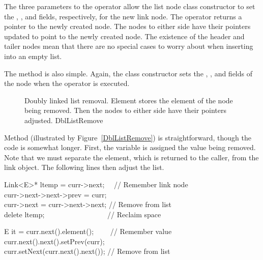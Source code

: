The three parameters to the 
operator allow the list node
class constructor to set the , , and
 fields, respectively, for the new link node.
The  operator returns a pointer to the newly created node.
The nodes to either side have their pointers updated to point to the
newly created node.
The existence of the header and tailer nodes mean that there are no
special cases to worry about when inserting into an empty list.

The  method is also simple.
Again, the  class constructor sets the ,
, and  fields of the node when the 
operator is executed.

\begin{figure}
\vspace{-\bigskipamount}

{Doubly linked list removal.
Element  stores the element of the node being removed.
Then the nodes to either side have their pointers adjusted.}
{DblListRemove}
\bigskip
\end{figure}

Method  (illustrated by
Figure~\ref{DblListRemove})
is straightforward, though the code is somewhat longer.
First, the variable  is assigned the value being removed.
Note that we must separate the element, which is returned to the
caller, from the link object.
The following lines then adjust the list.
\medskip

{\begin{progenv}
Link<E>* ltemp = curr->next; \ \    // Remember link node\\
curr->next->next->prev = curr;\\
curr->next = curr->next->next;      // Remove from list\\
delete ltemp; \ \ \ \ \ \ \ \ \ \ \ \ \ \ \ \ \ // Reclaim space\\
\end{progenv}}{}
{\begin{progenv}
E it = curr.next().element(); \ \ \ \  // Remember value\\
curr.next().next().setPrev(curr);\\
curr.setNext(curr.next().next());  // Remove from list\\
\end{progenv}}{}

